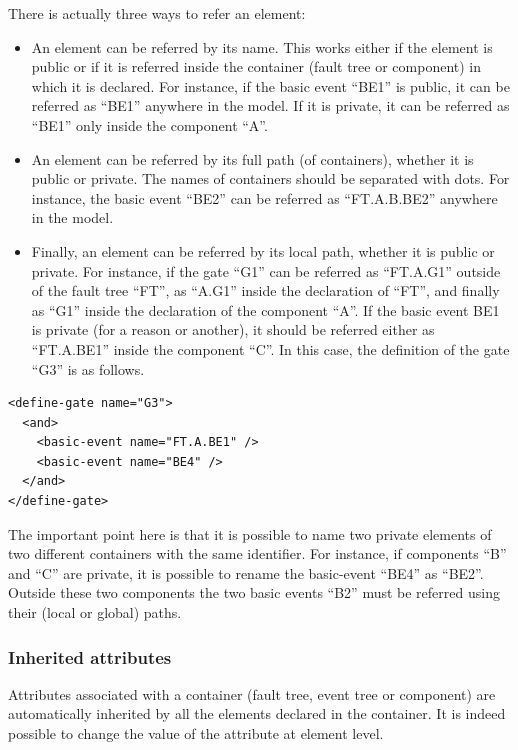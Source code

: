\documentclass[11pt]{article}
\begin{document}
There is actually three ways to refer an element:

\begin{itemize}
\item An element can be referred by its name. This works either if the
element is public or if it is referred inside the container (fault
tree or component) in which it is declared. For instance, if the
basic event ``BE1'' is public, it can be referred as ``BE1'' anywhere in
the model. If it is private, it can be referred as ``BE1'' only inside
the component ``A''.

\item An element can be referred by its full path (of containers), whether
it is public or private. The names of containers should be separated
with dots. For instance, the basic event ``BE2'' can be referred as
``FT.A.B.BE2'' anywhere in the model.

\item Finally, an element can be referred by its local path, whether it is
public or private. For instance, if the gate ``G1'' can be referred as
``FT.A.G1'' outside of the fault tree ``FT'', as ``A.G1'' inside the
declaration of ``FT'', and finally as ``G1'' inside the declaration of
the component ``A''. If the basic event BE1 is private (for a reason or
another), it should be referred either as ``FT.A.BE1'' inside the
component ``C''. In this case, the definition of the gate ``G3'' is as
follows.
\end{itemize}
\lstset{language=XML,label= ,caption= ,captionpos=b,numbers=none}
\begin{lstlisting}
<define-gate name="G3">
  <and>
    <basic-event name="FT.A.BE1" />
    <basic-event name="BE4" />
  </and>
</define-gate>
\end{lstlisting}

The important point here is that it is possible to name two private
elements of two different containers with the same identifier. For
instance, if components ``B'' and ``C'' are private, it is possible to
rename the basic-event ``BE4'' as ``BE2''. Outside these two components the
two basic events ``B2'' must be referred using their (local or global)
paths.

\subsubsection{Inherited attributes}
\label{sec:orgd4696d8}

Attributes associated with a container (fault tree, event tree or
component) are automatically inherited by all the elements declared in
the container. It is indeed possible to change the value of the
attribute at element level.
\end{document}

